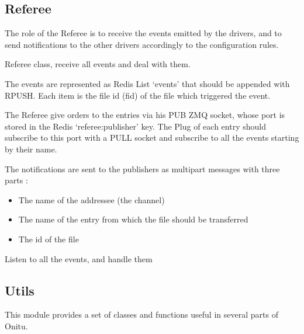 \documentclass[letterpaper,10pt,english]{sphinxmanual}
\begin{document}
\subsection{Referee}
\label{components:referee}
The role of the Referee is to receive the events emitted by the drivers, and to send notifications to the other drivers accordingly to the configuration rules.

\begin{fulllineitems}
\label{components:onitu.referee.Referee}
Referee class, receive all events and deal with them.

The events are represented as Redis List `events' that should be
appended with RPUSH. Each item is the file id (fid) of the file
which triggered the event.

The Referee give orders to the entries via his PUB ZMQ socket,
whose port is stored in the Redis `referee:publisher' key.
The Plug of each entry should subscribe to this port with a PULL
socket and subscribe to all the events starting by their name.

The notifications are sent to the publishers as multipart
messages with three parts :
\begin{itemize}
\item {} 
The name of the addressee (the channel)

\item {} 
The name of the entry from which the file should be transferred

\item {} 
The id of the file

\end{itemize}

\begin{fulllineitems}
\label{components:onitu.referee.Referee.listen}
Listen to all the events, and handle them

\end{fulllineitems}


\end{fulllineitems}



\subsection{Utils}
\label{components:utils}\label{components:module-onitu.utils}
This module provides a set of classes and functions useful in several
parts of Onitu.
\end{document}
